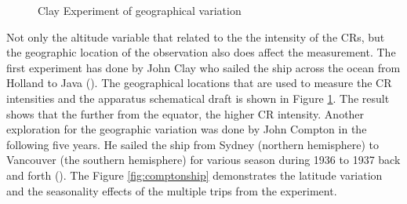 \begin{figure}[h!]
    \centering
        \hfill
        \caption{Clay Experiment of geographical variation}
       \label{fig:clay_cr_ship}
\end{figure}

Not only the altitude variable that related to the 
the intensity of the CRs, but the geographic location of the 
observation also does affect the measurement.
The first experiment has done by John Clay who
sailed the ship across the ocean from Holland to Java
(\cite{Clay1927,Clay1928}). The geographical locations that are used to measure the CR intensities and the apparatus schematical draft is shown in Figure
\ref{fig:clay_cr_ship}. The result shows that
the further from the equator, the higher CR intensity.
Another exploration for the geographic variation was 
done by John Compton in the following five years.
He sailed the ship from Sydney (northern hemisphere)
to Vancouver (the southern hemisphere) for various season
during 1936 to 1937 back and forth (\cite{compton1937cosmic}).
The Figure \ref{fig:comptonship} demonstrates the 
latitude variation and the seasonality effects of the 
multiple trips from the experiment.

